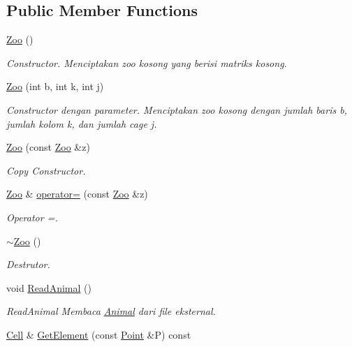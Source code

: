 \subsection*{Public Member Functions}
\begin{DoxyCompactItemize}
\item 
\hyperlink{classZoo_aaa0bf87b544fccd087e471ee0913709c}{Zoo} ()
\begin{DoxyCompactList}\small\item\em Constructor. Menciptakan zoo kosong yang berisi matriks kosong. \end{DoxyCompactList}\item 
\hyperlink{classZoo_a1d2ee3cc08057d114174ad997632f604}{Zoo} (int b, int k, int j)
\begin{DoxyCompactList}\small\item\em Constructor dengan parameter. Menciptakan zoo kosong dengan jumlah baris b, jumlah kolom k, dan jumlah cage j. \end{DoxyCompactList}\item 
\hyperlink{classZoo_a891edf2fa47d023068058e3745964e18}{Zoo} (const \hyperlink{classZoo}{Zoo} \&z)
\begin{DoxyCompactList}\small\item\em Copy Constructor. \end{DoxyCompactList}\item 
\hyperlink{classZoo}{Zoo} \& \hyperlink{classZoo_a62df0863e76f6d75a837c0445326deb7}{operator=} (const \hyperlink{classZoo}{Zoo} \&z)
\begin{DoxyCompactList}\small\item\em Operator =. \end{DoxyCompactList}\item 
\hyperlink{classZoo_ab65ebe1fa60f6cf2a7cc55f78ff06ba5}{$\sim$\+Zoo} ()
\begin{DoxyCompactList}\small\item\em Destrutor. \end{DoxyCompactList}\item 
void \hyperlink{classZoo_a56db9c646afb72b7d277b6bea76e675c}{Read\+Animal} ()
\begin{DoxyCompactList}\small\item\em Read\+Animal Membaca \hyperlink{classAnimal}{Animal} dari file eksternal. \end{DoxyCompactList}\item 
\hyperlink{classCell}{Cell} \& \hyperlink{classZoo_a0128c0b360793ac6aa8922b4cf2cc57f}{Get\+Element} (const \hyperlink{classPoint}{Point} \&P) const 

\end{DoxyCompactItemize}
